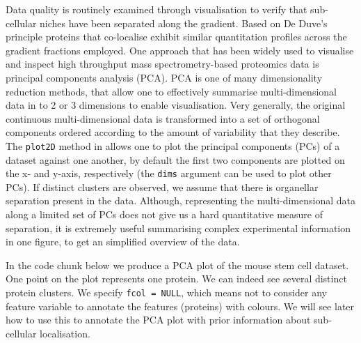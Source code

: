 Data quality is routinely examined through visualisation to verify
that sub-cellular niches have been separated along the gradient. Based
on De Duve's principle \cite{DeDuve:1981} proteins that co-localise
exhibit similar quantitation profiles across the gradient fractions
employed. One approach that has been widely used to visualise and
inspect high throughput mass spectrometry-based proteomics data is
principal components analysis (PCA). PCA is one of many dimensionality
reduction methods, that allow one to effectively summarise
multi-dimensional data in to 2 or 3 dimensions to enable
visualisation. Very generally, the original continuous
multi-dimensional data is transformed into a set of orthogonal
components ordered according to the amount of variability that they
describe. The \texttt{plot2D} method in  allows one to
plot the principal components (PCs) of a dataset against one another,
by default the first two components are plotted on the x- and y-axis,
respectively (the \texttt{dims} argument can be used to plot other PCs). If
distinct clusters are observed, we assume that there is organellar
separation present in the data. Although, representing the
multi-dimensional data along a limited set of PCs does not give us a
hard quantitative measure of separation, it is extremely useful
summarising complex experimental information in one figure, to get an
simplified overview of the data.

In the code chunk below we produce a PCA plot of the mouse stem cell
dataset. One point on the plot represents one protein. We can indeed
see several distinct protein clusters. We specify \texttt{fcol = NULL}, which
means not to consider any feature variable to annotate the features
(proteins) with colours. We will see later how to use this to annotate
the PCA plot with prior information about sub-cellular localisation. 

